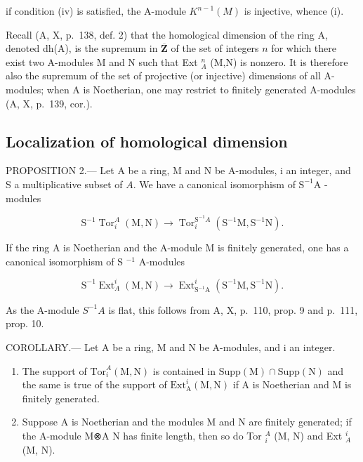 if condition (iv) is satisfied, the A-module \(K^{n-1}(M)\) is injective, whence (i).

Recall (A, X, p.~138, def. 2) that the homological dimension of the ring A, denoted dh(A), is the supremum in \(\overline{\mathbf{Z}}\) of the set of integers \(n\) for which there exist two A-modules M and N such that Ext \(_{A}^{n}\) (M,N) is nonzero. It is therefore also the supremum of the set of projective (or injective) dimensions of all A-modules; when A is Noetherian, one may restrict to finitely generated A-modules (A, X, p.~139, cor.).

\subsection{Localization of homological dimension}

PROPOSITION 2.--- Let A be a ring, M and N be A-modules, i an integer, and S a multiplicative subset of \(A\). We have a canonical isomorphism of \(\mathrm{S}^{-1}\mathrm{A}\) -modules

\[
\mathrm{S} ^ {- 1} \operatorname{Tor} _ {i} ^ {A} (\mathrm{M}, \mathrm{N}) \longrightarrow \operatorname{Tor} _ {i} ^ {\mathrm{S} ^ {- 1} A} (\mathrm{S} ^ {- 1} \mathrm{M}, \mathrm{S} ^ {- 1} \mathrm{N}).
\]

If the ring A is Noetherian and the A-module M is finitely generated, one has a canonical isomorphism of S \(^{-1}\) A-modules

\[
\mathrm{S} ^ {- 1} \operatorname{Ext} _ {A} ^ {i} (\mathrm{M}, \mathrm{N}) \longrightarrow \operatorname{Ext} _ {\mathrm{S} ^ {- 1} \mathrm{A}} ^ {i} (\mathrm{S} ^ {- 1} \mathrm{M}, \mathrm{S} ^ {- 1} \mathrm{N}).
\]

As the A-module \(S^{-1}A\) is flat, this follows from A, X, p.~110, prop. 9 and p.~111, prop. 10.

COROLLARY.--- Let A be a ring, M and N be A-modules, and i an integer.

\begin{enumerate}
\def\labelenumi{\alph{enumi})}
\item
  The support of \(\mathrm{Tor}_{i}^{A}(\mathrm{M},\mathrm{N})\) is contained in \(\mathrm{Supp}(\mathrm{M})\cap \mathrm{Supp}(\mathrm{N})\) and the same is true of the support of \(\mathrm{Ext}_{\mathrm{A}}^{i}(\mathrm{M},\mathrm{N})\) if A is Noetherian and M is finitely generated.
\item
  Suppose A is Noetherian and the modules M and N are finitely generated; if the A-module M⊗A N has finite length, then so do Tor \(_{i}^{A}\) (M, N) and Ext \(_{A}^{i}\) (M, N).
\end{enumerate}

